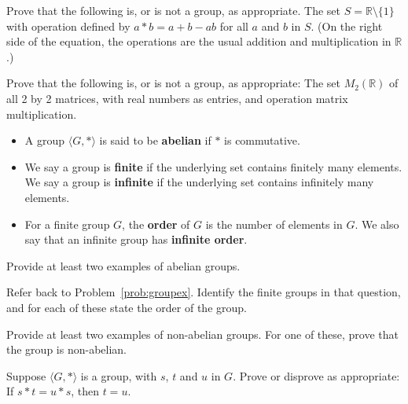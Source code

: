 \begin{problem}
Prove that the following is, or is not a group, as appropriate.
The set \( S = \mathbb{R} \setminus \{1\} \) with operation defined by \( a * b = a + b - ab \) for all \(a\) and \(b\) in \(S\). (On the right side of the equation, the operations are the usual addition and multiplication in \(\mathbb{R} \).)
\end{problem}

\begin{problem}
Prove that the following is, or is not a group, as appropriate: The set \(M_2(\mathbb{R})\) of all 2 by 2 matrices, with real numbers as entries, and operation matrix multiplication.
\end{problem}

\begin{definition}\label{def:orderofgroup} \mbox{}
\begin{itemize}[itemsep=0pt, topsep=3pt]
  \item A group \( \langle G, * \rangle \) is said to be \textbf{abelian} if \(*\) is commutative.
  \item We say a group is \textbf{finite} if the underlying set contains finitely many elements. We say a group is \textbf{infinite} if the underlying set contains infinitely many elements.
  \item For a finite group \(G\), the \textbf{order} of \(G\) is the number of elements in \(G\). We also say that an infinite group has \textbf{infinite order}.
\end{itemize}
\end{definition}

\begin{problem}
Provide at least two examples of abelian groups.
\end{problem}

\begin{problem}
Refer back to Problem~\ref{prob:groupex}. Identify the finite groups in that question, and for each of these state the order of the group.
\end{problem}

\begin{problem}
Provide at least two examples of non-abelian groups. For one of these, prove that the group is non-abelian.
\end{problem}

\begin{problem}
Suppose \( \langle G, * \rangle \) is a group, with \(s\), \(t\) and \(u\) in \(G\). Prove or disprove as appropriate: If \( s * t = u * s \), then \(t = u\).
\end{problem}


